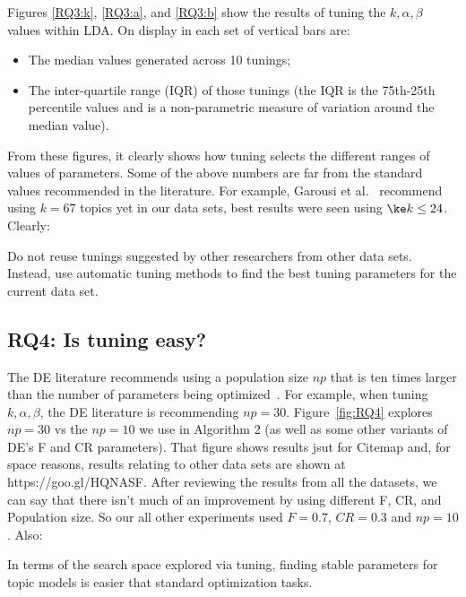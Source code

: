 \documentclass[10pt,conference]{IEEEtran}
\newcommand{\bi}{\begin{itemize}}
\newcommand{\ei}{\end{itemize}}
\theoremstyle{break}
\begin{document}
Figures \ref{RQ3:k}, \ref{RQ3:a}, and \ref{RQ3:b} show the results of tuning the $k,\alpha,\beta$
values within LDA. On display in each set of vertical bars are:
\bi
\item The median values generated across 10 tunings;
\item The inter-quartile range (IQR) of those tunings (the IQR is the 75th-25th percentile values and is a non-parametric measure of variation
  around the median value).
  \ei
  From these figures, it
clearly shows how tuning selects the different ranges of values of
parameters.
Some of the above numbers are far from the standard values recommended in the literature.
For example, Garousi et al.~\cite{garousi2016citations} recommend using $k=67$ topics
yet in our data sets, best results were seen using $\ke k \le 24$.
Clearly:

\begin{lesson}
  Do not  reuse tunings suggested by other researchers from other data sets.
  Instead, use automatic tuning methods to find the best tuning parameters for the current data set.
\end{lesson}

\subsection{\textbf{RQ4: Is  tuning  easy?}}


The DE literature
recommends using a population size $np$ that is ten times larger than the number of parameters being
optimized~\cite{storn1997differential}.  For example, when tuning $k,\alpha,\beta$,
the DE literature is recommending $np=30$.
Figure~\ref{fig:RQ4} explores $np=30$ vs the $np=10$ we use in Algorithm 2
(as well as some other variants of DE's F and CR parameters).
That figure shows results jsut for Citemap and, for space reasons, results
relating to other data sets are shown at https://goo.gl/HQNASF.
After reviewing the results from all the datasets, we can say that there isn't much of an improvement by using different F, CR, and Population size. So our all other experiments used $F=0.7$, $CR=0.3$ and $np = 10$.
Also:

\begin{lesson}
  In terms of the search space explored via tuning, finding stable parameters for
  topic models is easier that standard optimization tasks.
\end{lesson}
\end{document}
